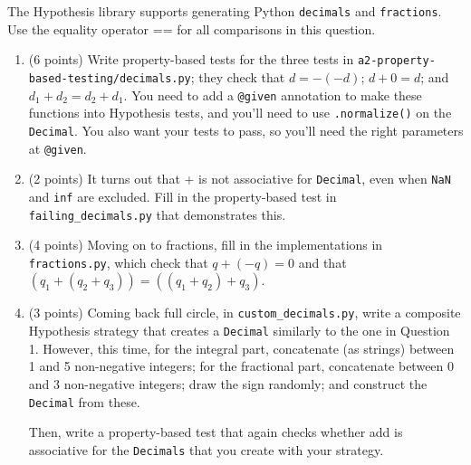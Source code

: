 
The Hypothesis library supports generating Python \texttt{decimals} and \texttt{fractions}.
Use the equality operator == for all comparisons in this question.
\begin{enumerate}[label=(\alph*)]
\item (6 points) Write property-based tests for the three tests
in \texttt{a2-property-based-testing/decimals.py}; they check
that $d = -(-d)$; $d + 0 = d$; and $d_1 + d_2 = d_2 + d_1$. You need to add a
\texttt{@given} annotation to make these functions into Hypothesis tests,
and you'll need to use \texttt{.normalize()} on the \texttt{Decimal}. You also
want your tests to pass, so you'll need the right parameters at \texttt{@given}.
\item (2 points) It turns out that + is not associative for \texttt{Decimal},
  even when \texttt{NaN} and \texttt{inf} are excluded. Fill in the property-based test
  in \texttt{failing\_decimals.py} that demonstrates this.
\item (4 points) Moving on to fractions, fill in the implementations in
  \texttt{fractions.py}, which check that $q + (-q) = 0$ and that $(q_1 + (q_2 + q_3)) = ((q_1 + q_2) + q_3)$.
\item (3 points) Coming back full circle, in \texttt{custom\_decimals.py}, write a composite Hypothesis strategy
  that creates a \texttt{Decimal} similarly to the one in Question 1. However,
  this time, for the integral part, concatenate (as strings) between 1 and 5 non-negative integers;
  for the fractional part, concatenate between 0 and 3 non-negative integers; draw the
  sign randomly; and construct the \texttt{Decimal} from these.

  Then, write a property-based test that again checks whether add is associative for the
  \texttt{Decimals} that you create with your strategy.
\end{enumerate}

